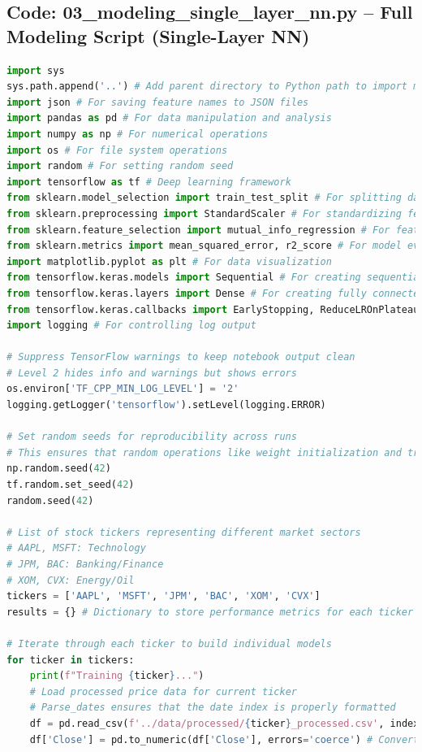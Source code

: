 \documentclass[12pt]{article}
\begin{document}
\subsection*{Code: 03\_modeling\_single\_layer\_nn.py – Full Modeling Script (Single-Layer NN)}

\begin{lstlisting}[language=Python]
import sys
sys.path.append('..') # Add parent directory to Python path to import modules from parent directory
import json # For saving feature names to JSON files
import pandas as pd # For data manipulation and analysis
import numpy as np # For numerical operations
import os # For file system operations
import random # For setting random seed
import tensorflow as tf # Deep learning framework
from sklearn.model_selection import train_test_split # For splitting data into train and test sets
from sklearn.preprocessing import StandardScaler # For standardizing features to zero mean and unit variance
from sklearn.feature_selection import mutual_info_regression # For feature selection using information theory
from sklearn.metrics import mean_squared_error, r2_score # For model evaluation
import matplotlib.pyplot as plt # For data visualization
from tensorflow.keras.models import Sequential # For creating sequential neural network models
from tensorflow.keras.layers import Dense # For creating fully connected neural network layers
from tensorflow.keras.callbacks import EarlyStopping, ReduceLROnPlateau # For optimizing training process
import logging # For controlling log output

# Suppress TensorFlow warnings to keep notebook output clean
# Level 2 hides info and warnings but shows errors
os.environ['TF_CPP_MIN_LOG_LEVEL'] = '2'
logging.getLogger('tensorflow').setLevel(logging.ERROR)

# Set random seeds for reproducibility across runs
# This ensures that random operations like weight initialization and train/test splits are consistent
np.random.seed(42)
tf.random.set_seed(42)
random.seed(42)

# List of stock tickers representing different market sectors
# AAPL, MSFT: Technology
# JPM, BAC: Banking/Finance
# XOM, CVX: Energy/Oil
tickers = ['AAPL', 'MSFT', 'JPM', 'BAC', 'XOM', 'CVX']
results = {} # Dictionary to store performance metrics for each ticker

# Iterate through each ticker to build individual models
for ticker in tickers:
    print(f"Training {ticker}...")
    # Load processed price data for current ticker
    # Parse_dates ensures that the date index is properly formatted
    df = pd.read_csv(f'../data/processed/{ticker}_processed.csv', index_col='Date', parse_dates=True)
    df['Close'] = pd.to_numeric(df['Close'], errors='coerce') # Convert 'Close' column to numeric, handling any errors


\end{lstlisting}
\end{document}
